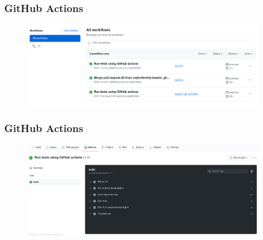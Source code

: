 \documentclass[aspectratio=169]{beamer}
\begin{document}
\begin{frame}
	\frametitle{GitHub Actions}
	\begin{figure}[ht!]
	\begin{center}
  	  \includegraphics[width=0.9\textwidth]{img/gh-actions-1.png}
	\end{center}
	\end{figure}
\end{frame}

\begin{frame}
	\frametitle{GitHub Actions}
	\begin{figure}[ht!]
	\begin{center}
  	  \includegraphics[width=0.9\textwidth]{img/gh-actions-2.png}
	\end{center}
	\end{figure}
\end{frame}
\end{document}
